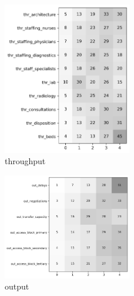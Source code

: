 \documentclass{article}
\begin{document}
\begin{figure}[H]
    \centering
        \includegraphics[width=0.5\textwidth]{../output/plots/throughput}
        \caption{throughput}
        \label{fig:throughput}
\end{figure}

\begin{figure}[H]
    \centering
        \includegraphics[width=0.5\textwidth]{../output/plots/output}
        \caption{output}
        \label{fig:output}
\end{figure}
\end{document}
